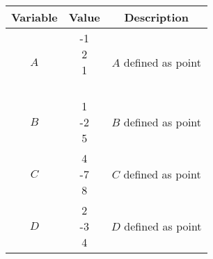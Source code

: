 \begin{tabular}{|c| c |  c |}
\hline
\textbf{Variable} & \textbf{Value} & \textbf{Description} \\
\hline
$A$ & \vec{-1 \\ 2\\ 1\\ \\} & $A$ defined as point \\
\hline
$B$ & \vec{1 \\ -2\\ 5\\}  & $B$ defined as point  \\
\hline
$C$ & \vec{4 \\ -7\\ 8\\} & $C$ defined as point\\
\hline
$D$ & \vec{2 \\ -3\\ 4\\} & $D$ defined as point \\
\hline
\end{tabular} 
